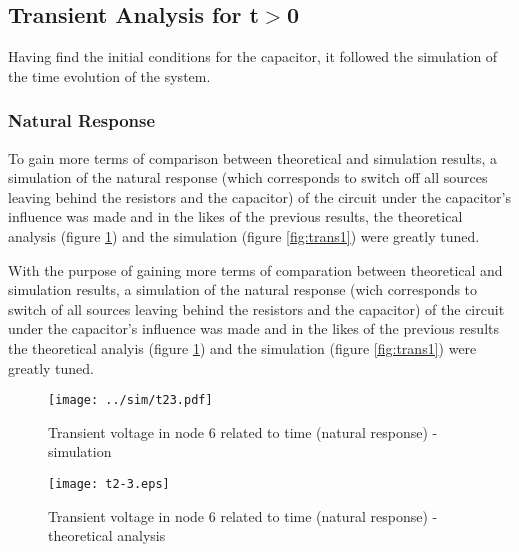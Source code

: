 \newpage
\subsection{Transient Analysis for t$>$0}

Having find the initial conditions for the capacitor, it followed the simulation of the time evolution of the system.

\subsubsection{Natural Response}

To gain more terms of comparison between theoretical and simulation results, a simulation of the natural response (which corresponds to switch off all sources leaving behind the resistors and the capacitor) of the circuit under the capacitor's influence was made and in the likes of the previous results, the theoretical analysis (figure \ref{fig:compnat}) and the simulation (figure \ref{fig:trans1}) were greatly tuned.

With the purpose of gaining more terms of comparation between theoretical and simulation results, a simulation of the natural response (wich corresponds to switch of all sources leaving behind the resistors and the capacitor) of the circuit under the capacitor's influence was made and in the likes of the previous results the theoretical analyis (figure \ref{fig:compnat}) and the simulation (figure \ref{fig:trans1}) were greatly tuned.


\begin{figure}[h] \centering
  \begin{minipage}{.5\textwidth}
    \texttt{[image: ../sim/t23.pdf]}
    \caption{Transient voltage in node 6 related to time (natural response) - simulation}
    \label{fig:trans1}
    \end{minipage}%
  \begin{minipage}{.5\textwidth}
  \centering
    \texttt{[image: t2-3.eps]}
    \caption{Transient voltage in node 6 related to time (natural response) - theoretical analysis}
    \label{fig:compnat}
      \end{minipage}%
\end{figure}

